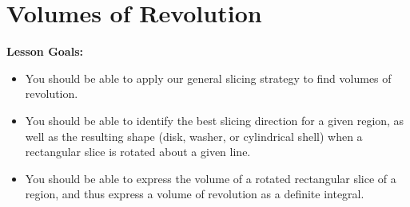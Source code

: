 \documentclass[main]{subfiles}
\begin{document}
\ifSubfilesClassLoaded{%
  \chaptermark{\chapterone}
}{}

\section{Volumes of Revolution} \label{ws1-4}


\begin{framed}
\textbf{Lesson Goals:}
\begin{itemize}
\item You should be able to apply our general slicing strategy to find volumes of revolution.
\item You should be able to identify the best slicing direction for a given region, as well as the resulting shape (disk, washer, or cylindrical shell) when a rectangular slice is rotated about a given line.
\item You should be able to express the volume of a rotated rectangular slice of a region, and thus express a volume of revolution as a definite integral.
\end{itemize}
\end{framed}
\end{document}
